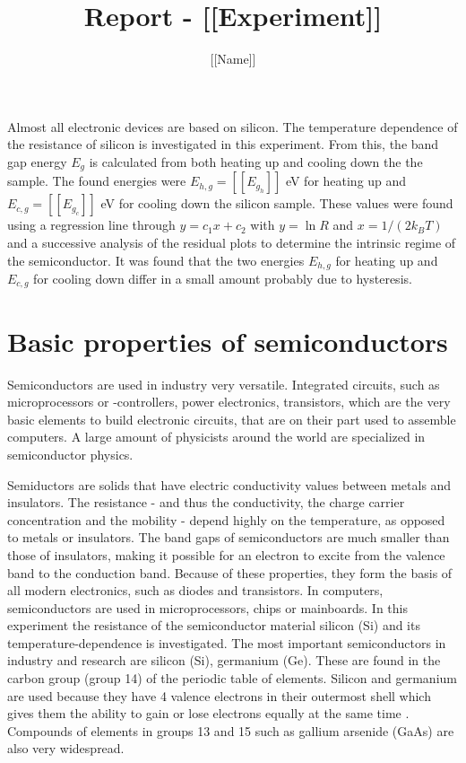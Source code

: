 \documentclass[a4paper]{article}
\author{[[Name]]}
\title{Report - [[Experiment]]}
\begin{document}

\maketitle
\abstract 

Almost all electronic devices are based on silicon. The temperature dependence of the resistance of silicon is investigated in this experiment. From this, the band gap energy $E_g$ is calculated from both heating up and cooling down the the sample. The found energies were $E_{h,g} = [[E_g_h]]$ eV for heating up and $E_{c,g} = [[E_g_c]]$ eV for cooling down the silicon sample. These values were found using a regression line through $y=c_1 x + c_2$ with $y = \ln{R}$ and $x = 1/(2 k_B T)$ and a successive analysis of the residual plots to determine the intrinsic regime of the semiconductor. It was found that the two energies $E_{h,g}$ for heating up and $E_{c,g}$ for cooling down differ in a small amount probably due to hysteresis.

\section{Basic properties of semiconductors}
\label{sec:introduction}

Semiconductors are used in industry very versatile. Integrated circuits, such as microprocessors or -controllers, power electronics, transistors, which are the very basic elements to build electronic circuits, that are on their part used to assemble computers. A large amount of physicists around the world are specialized in semiconductor physics.

Semiductors are solids that have electric conductivity values between metals and insulators. The resistance - and thus the conductivity, the charge carrier concentration and the mobility - depend highly on the temperature, as opposed to metals or insulators. The band gaps of semiconductors are much smaller than those of insulators, making it possible for an electron to excite from the valence band to the conduction band. Because of these properties, they form the basis of all modern electronics, such as diodes and transistors. In computers, semiconductors are used in microprocessors, chips or mainboards. In this experiment the resistance of the semiconductor material silicon (Si) and its temperature-dependence is investigated. The most important semiconductors in industry and research are silicon (Si), germanium (Ge). These are found in the carbon group (group 14) of the periodic table of elements. Silicon and germanium are used because they have 4 valence electrons in their outermost shell which gives them the ability to gain or lose electrons equally at the same time \cite{yacobi2003}. Compounds of elements in groups 13 and 15 such as gallium arsenide (GaAs) are also very widespread.
\end{document}
